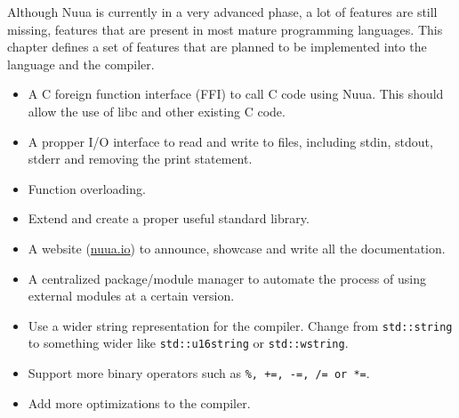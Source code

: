 Although Nuua is currently in a very advanced phase, a lot of features are still missing, features that are present in most
mature programming languages. This chapter defines a set of features that are planned to be implemented into the language and
the compiler.

\begin{itemize}
    \item A C foreign function interface (FFI) to call C code using Nuua. This should allow the use of libc and other existing C code.
    \item A propper I/O interface to read and write to files, including stdin, stdout, stderr and removing the print statement.
    \item Function overloading.
    \item Extend and create a proper useful standard library.
    \item A website (\href{https://nuua.io}{nuua.io}) to announce, showcase and write all the documentation.
    \item A centralized package/module manager to automate the process of using external modules at a certain version.
    \item Use a wider string representation for the compiler. Change from \texttt{std::string} to something wider like
        \texttt{std::u16string} or \texttt{std::wstring}.
    \item Support more binary operators such as \texttt{\%, +=, -=, /= or *=}.
    \item Add more optimizations to the compiler.
\end{itemize}
